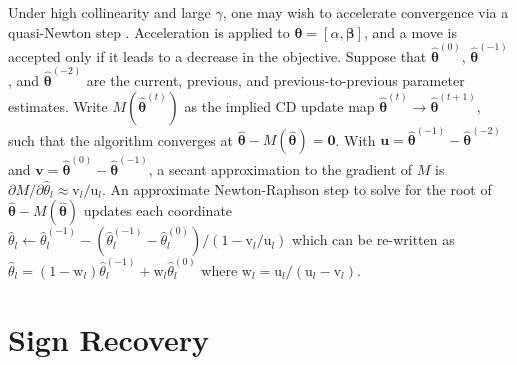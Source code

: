 \documentclass[12pt]{article}
\newcommand{\bs}[1]{\boldsymbol{#1}}
\newcommand{\mr}[1]{\mathrm{#1}}
\newcommand{\bm}[1]{\mathbf{#1}}
\begin{document}
Under high collinearity and large $\gamma$, one may wish to accelerate convergence via a quasi-Newton step
\citep[e.g.,][]{lange_numerical_2010}. Acceleration is applied to $\bs{\theta}
= [\alpha,\bs{\beta}]$, and a move is accepted only if it leads to a decrease
in the objective. Suppose that $\bs{\hat\theta}^{(0)}$,
$\bs{\hat\theta}^{(-1)}$, and $\bs{\hat\theta}^{(-2)}$ are the current,
previous, and previous-to-previous parameter estimates.  Write
$M(\bs{\hat\theta}^{(t)})$ as the implied CD update map $\bs{\hat\theta}^{(t)}
\rightarrow \bs{\hat\theta}^{(t+1)}$, such that the algorithm converges at
$\bs{\hat\theta} - M(\bs{\hat\theta}) = \bm{0}$.  With $\bm{u} =
\bs{\hat\theta}^{(-1)} - \bs{\hat\theta}^{(-2)}$ and $\bm{v} =
\bs{\hat\theta}^{(0)} - \bs{\hat\theta}^{(-1)}$, a secant approximation to the
gradient of $M$ is $\partial M/\partial \hat\theta_l \approx
\mr{v}_l/\mr{u}_l$.  An approximate Newton-Raphson step to solve for the root
of $\bs{\hat\theta} - M(\bs{\hat\theta}) $  updates each coordinate $\hat
\theta_l \gets \hat\theta_l^{(-1)} - (\hat\theta_l^{(-1)} -
\hat\theta_l^{(0)})/(1-\mr{v}_l/\mr{u}_l)$ which can be re-written as
$\hat\theta_l = (1-\mr{w}_l)\hat\theta_l^{(-1)} + \mr{w}_l\hat\theta_l^{(0)} $
where $\mr{w}_l = \mr{u}_l/(\mr{u}_l - \mr{v}_l)$.


\section{Sign Recovery}
\label{extraproof}
\end{document}
